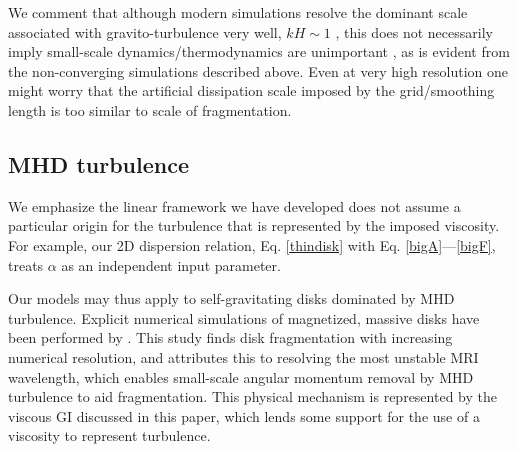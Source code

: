 We comment that although modern simulations resolve the dominant
scale associated with gravito-turbulence very well, $kH\sim 1$
\citep{cossins09}, this does not
necessarily imply small-scale dynamics/thermodynamics are unimportant 
\citep[especially for non-linear evolution, ][]{young15},  
as is evident from the non-converging simulations described above.   
Even at very high resolution one might worry that the artificial dissipation scale
imposed by the grid/smoothing length is too similar to scale of fragmentation.

\subsection{MHD turbulence}\label{MHD}%
We emphasize the linear framework we have developed does not assume  
a particular origin for the turbulence that is represented by the imposed
viscosity. For example, our 2D dispersion 
relation, Eq. \ref{thindisk} with Eq. \ref{bigA}---\ref{bigF}, treats 
$\alpha$ as an independent input parameter. 


Our models may thus apply to self-gravitating disks dominated by MHD
turbulence.     
Explicit numerical simulations of magnetized, massive disks have been performed 
by \cite{fromang05}. This study finds disk fragmentation with increasing numerical
resolution, and attributes this to resolving the most unstable MRI
wavelength, which enables small-scale angular momentum removal by MHD
turbulence to aid fragmentation. %
This physical mechanism is represented by the viscous GI 
discussed in this paper, which lends some support for  
the use of a viscosity to represent turbulence.    

